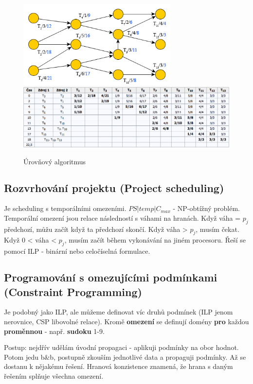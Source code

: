 \begin{figure}[h]
    \begin{center}
        \includegraphics[width=80mm]{10/images/level-alg}
        \includegraphics[width=130mm]{10/images/level-alg-tab}
    \end{center}
    \vspace{-5px}
    \caption{Úrovňový algoritmus}
    \vspace{-5px}
\end{figure}


\subsection{Rozvrhování projektu (Project scheduling)}
Je scheduling s temporálními omezeními. $PS|temp|C_{max}$ - NP-obtížný problém. Temporální omezení jsou relace následností s váhami na hranách. Když váha = $p_j$ předchozí, můžu začít když ta předchozí skončí. Když váha > $p_j$, musím čekat. Když 0 < váha < $p_j$, musím začít během vykonávání na jiném procesoru. Řeší se pomocí ILP - binární nebo celočíselná formulace.

\subsection{Programování s omezujícími podmínkami (Constraint Programming)}
Je podobný jako ILP, ale můžeme definovat víc druhů podmínek (ILP jenom nerovnice, CSP libovolné relace). Kromě \textbf{omezení} se definují domény \textbf{pro} každou \textbf{proměnnou} - např. \textbf{sudoku} 1-9.

Postup: nejdřív udělám úvodní propagaci - aplikuji podmínky na obor hodnot. Potom jedu b\&b, postupně zkouším jednotlivé data a propaguji podmínky. Až se dostanu k nějakému řešení. Hranová konzistence znamená, že hrana s daným řešením splňuje všechna omezení.

